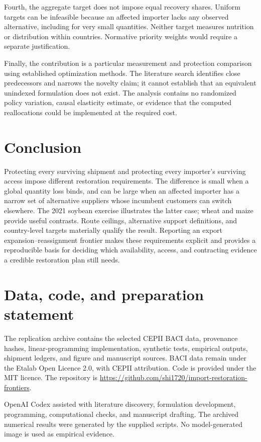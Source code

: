 \documentclass[11pt,a4paper]{article}
\begin{document}
Fourth, the aggregate target does not impose equal recovery shares. Uniform targets can be infeasible because an affected importer lacks any observed alternative, including for very small quantities. Neither target measures nutrition or distribution within countries. Normative priority weights would require a separate justification.

Finally, the contribution is a particular measurement and protection comparison using established optimization methods. The literature search identifies close predecessors and narrows the novelty claim; it cannot establish that an equivalent unindexed formulation does not exist. The analysis contains no randomized policy variation, causal elasticity estimate, or evidence that the computed reallocations could be implemented at the required cost.

\section{Conclusion}
Protecting every surviving shipment and protecting every importer's surviving access impose different restoration requirements. The difference is small when a global quantity loss binds, and can be large when an affected importer has a narrow set of alternative suppliers whose incumbent customers can switch elsewhere. The 2021 soybean exercise illustrates the latter case; wheat and maize provide useful contrasts. Route ceilings, alternative support definitions, and country-level targets materially qualify the result. Reporting an export expansion--reassignment frontier makes these requirements explicit and provides a reproducible basis for deciding which availability, access, and contracting evidence a credible restoration plan still needs.

\section*{Data, code, and preparation statement}
The replication archive contains the selected CEPII BACI data, provenance hashes, linear-programming implementation, synthetic tests, empirical outputs, shipment ledgers, and figure and manuscript sources. BACI data remain under the Etalab Open Licence 2.0, with CEPII attribution. Code is provided under the MIT licence. The repository is \url{https://github.com/shi1720/import-restoration-frontiers}.

OpenAI Codex assisted with literature discovery, formulation development, programming, computational checks, and manuscript drafting. The archived numerical results were generated by the supplied scripts. No model-generated image is used as empirical evidence.
\end{document}

